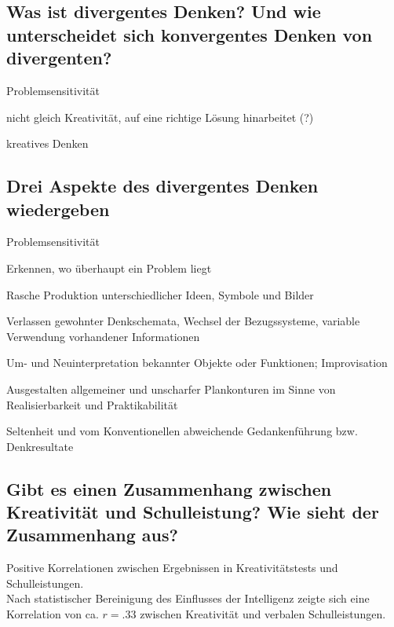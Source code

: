 \documentclass[a6paper,9pt,DIV=14]{scrartcl}
\begin{document}
\subsection{Was ist divergentes Denken? Und wie unterscheidet sich konvergentes Denken von divergenten? } %
    \begin{labeling}{Problemsensitivität}
        \item [konvergentes Denken] nicht gleich Kreativität, auf eine richtige Lösung hinarbeitet (?)
        \item [divergentes Denken] kreatives Denken
    \end{labeling}

\subsection{Drei Aspekte des divergentes Denken wiedergeben} %
    \begin{labeling}{Problemsensitivität}
        \item [Problemsensitivität] Erkennen, wo überhaupt ein Problem liegt
        \item [Flüssigkeit] Rasche Produktion unterschiedlicher Ideen, Symbole und Bilder
        \item [Flexibilität] Verlassen gewohnter Denkschemata, Wechsel der Bezugssysteme, variable Verwendung vorhandener Informationen
        \item [Redefinition] Um- und Neuinterpretation bekannter Objekte oder Funktionen; Improvisation
        \item [Elaboration] Ausgestalten allgemeiner und unscharfer Plankonturen im Sinne von Realisierbarkeit und Praktikabilität
        \item [Originalität] Seltenheit und vom Konventionellen abweichende Gedankenführung bzw. Denkresultate
    \end{labeling}

\subsection{Gibt es einen Zusammenhang zwischen Kreativität und Schulleistung? Wie sieht der Zusammenhang aus?}
    Positive Korrelationen zwischen Ergebnissen in Kreativitätstests und Schulleistungen.\\
    Nach statistischer Bereinigung des Einflusses der Intelligenz zeigte sich eine Korrelation von ca. $r = .33$ zwischen Kreativität und verbalen Schulleistungen.
\end{document}
